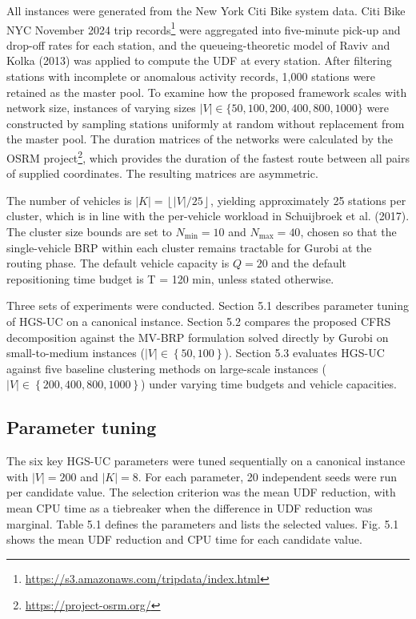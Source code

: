 \documentclass[11pt]{article}
\numberwithin{table}{section}
\numberwithin{figure}{section}
\begin{document}
All instances were generated from the New York Citi Bike system data. Citi Bike NYC November 2024 trip records\footnote{\url{https://s3.amazonaws.com/tripdata/index.html}} were aggregated into five-minute pick-up and drop-off rates for each station, and the queueing-theoretic model of Raviv and Kolka (2013) was applied to compute the UDF at every station. After filtering stations with incomplete or anomalous activity records, 1,000 stations were retained as the master pool. To examine how the proposed framework scales with network size, instances of varying sizes $|V|\in \{50,100,200,400,800,1000\}$ were constructed by sampling stations uniformly at random without replacement from the master pool. The duration matrices of the networks were calculated by the OSRM project\footnote{\url{https://project-osrm.org/}}, which provides the duration of the fastest route between all pairs of supplied coordinates. The resulting matrices are asymmetric.

The number of vehicles is $\left| K \right|=\left\lfloor |V|/25 \right\rfloor $, yielding approximately 25 stations per cluster, which is in line with the per-vehicle workload in Schuijbroek et al. (2017). The cluster size bounds are set to ${N_{\min}} = 10$ and ${N_{\max}} = 40$, chosen so that the single-vehicle BRP within each cluster remains tractable for Gurobi at the routing phase. The default vehicle capacity is $Q=20$ and the default repositioning time budget is T = 120 min, unless stated otherwise.

Three sets of experiments were conducted. Section 5.1 describes parameter tuning of HGS-UC on a canonical instance. Section 5.2 compares the proposed CFRS decomposition against the MV-BRP formulation solved directly by Gurobi on small-to-medium instances ($\mid V\mid \in \left\{ 50,100 \right\}$). Section 5.3 evaluates HGS-UC against five baseline clustering methods on large-scale instances ($\mid V\mid \in \left\{ 200,400,800,1000 \right\}$) under varying time budgets and vehicle capacities.

\subsection{Parameter tuning}

The six key HGS-UC parameters were tuned sequentially on a canonical instance with $\mid V\mid =200$ and $\left| K \right|=8$. For each parameter, 20 independent seeds were run per candidate value. The selection criterion was the mean UDF reduction, with mean CPU time as a tiebreaker when the difference in UDF reduction was marginal. Table 5.1 defines the parameters and lists the selected values. Fig. 5.1 shows the mean UDF reduction and CPU time for each candidate value.
\end{document}
